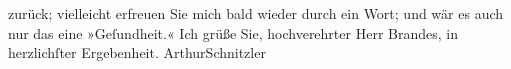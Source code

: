 \begin{ledgroupsized}[t]{13cm}
                    zurück; vielleicht erfreuen Sie mich bald wieder durch ein Wort; und wär es auch
                    nur das eine »Geſundheit.«\pend
           \pstart Ich grüße Sie, hochverehrter Herr Brandes, in herzlichſter Ergebenheit.
                        \spacefill\mbox{ArthurSchnitzler}\pend{}\endnumbering{}\end{ledgroupsized}  \newcommand{\dateiname}{L00705}\newcommand{\titel}{Arthur Schnitzler an Georg Brandes, 18. 7. 1897}\newcommand{\editorInnen}{Martin Anton Müller und Gerd-Hermann Susen}
      